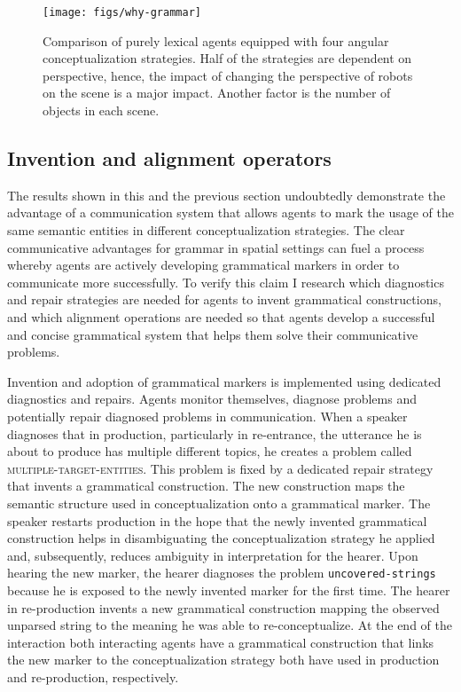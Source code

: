 \begin{figure}
\texttt{[image: figs/why-grammar]}
\caption[Comparison lexical versus grammatical agents]{%
Comparison of purely lexical agents equipped with four angular 
conceptualization strategies. Half of the strategies are dependent on 
perspective, hence, the impact of changing the perspective of robots on the scene
is a major impact. Another factor is the number of objects in each scene.}
\label{f:why-grammar}
\end{figure}

\subsection{Invention and alignment operators}
The results shown in this and the previous section undoubtedly demonstrate
the advantage of a communication system that allows agents to mark the usage 
of the same semantic entities in different conceptualization strategies. The clear 
communicative advantages for grammar in spatial settings can fuel a process whereby 
agents are actively developing grammatical markers in order to communicate more 
successfully. To verify this claim I research which diagnostics and repair 
strategies are needed for agents to invent grammatical constructions, and which 
alignment operations are needed so that agents develop a successful and concise 
grammatical system that helps them solve their communicative problems.

Invention and adoption of grammatical markers is implemented 
using dedicated diagnostics and repairs. Agents monitor themselves, 
diagnose problems and potentially repair 
diagnosed problems in communication.
When a speaker diagnoses that in production, particularly in re-entrance, 
the utterance he is about to produce has multiple different topics, he 
creates a problem called \textsc{multiple-target-entities}. 
This problem is fixed by a dedicated repair strategy that invents 
a grammatical construction. The new construction maps the semantic 
structure used in conceptualization onto a grammatical marker.
The speaker restarts production in the hope that the newly invented 
grammatical construction helps in disambiguating the conceptualization 
strategy he applied and, subsequently, reduces ambiguity in interpretation 
for the hearer. 
Upon hearing the new marker, the hearer diagnoses the problem {\footnotesize\tt uncovered-strings} 
because he is exposed to the newly invented marker for the first time. The hearer 
in re-production invents a new grammatical construction mapping the 
observed unparsed string to the meaning he was able to re-conceptualize. 
At the end of the interaction both interacting agents have a grammatical 
construction that links the new marker to the conceptualization strategy both 
have used in production and re-production, respectively.

